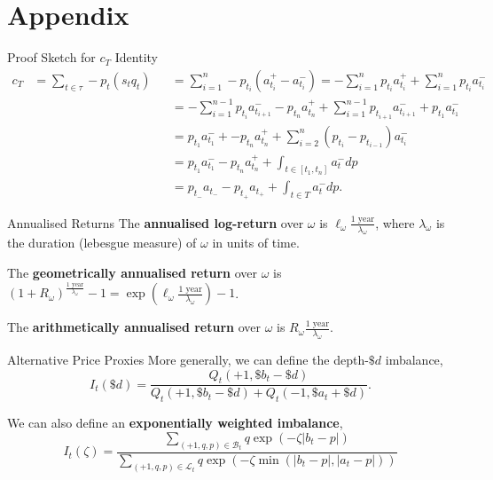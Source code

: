 \documentclass{beamer}
\begin{document}
\section{Appendix}
\begin{frame}{Proof Sketch for $c_T$ Identity}
	\begin{align*}
			c_{T}	&= \sum_{t\in\tau} - p_t (s_t q_t)	&&= \sum_{i=1}^n - p_{t_i} (a_{t_i}^+-a_{t_i}^-) = - \sum_{i=1}^n p_{t_i} a_{t_i}^+ + \sum_{i=1}^n p_{t_i} a_{t_i}^-
		\\		&					&&= - \sum_{i=1}^{n-1} p_{t_i} a_{t_{i+1}}^- - p_{t_n} a_{t_n}^+ + \sum_{i=1}^{n-1} p_{t_{i+1}} a_{t_{i+1}}^- + p_{t_1}a_{t_1}^-
		\\		&					&&= p_{t_1}a_{t_1}^- + - p_{t_n} a_{t_n}^+ + \sum_{i=2}^n (p_{t_i}-p_{t_{i-1}}) a_{t_i}^-
		\\		&					&&= p_{t_1}a_{t_1}^- - p_{t_n}a_{t_n}^+ + \int_{t\in[t_1,t_n]} a_t^- dp
		\\		&					&&= p_{t_-}a_{t_-} - p_{t_+}a_{t_+} + \int_{t\in T} a_t^- dp.
	\end{align*}
\end{frame}

\begin{frame}{Annualised Returns}
	The \textbf{annualised log-return} over $\omega$ is $\ell_\omega \frac{\textrm{1 year}}{\lambda_\omega}$, where $\lambda_\omega$ is the duration (lebesgue measure) of $\omega$ in units of time.%

	The \textbf{geometrically annualised return} over $\omega$ is $(1 + R_\omega)^\frac{\textrm{1 year}}{\lambda_\omega} - 1 = \exp\left(\ell_\omega \frac{\textrm{1 year}}{\lambda_\omega}\right) - 1$.

	The \textbf{arithmetically annualised return} over $\omega$ is $R_\omega \frac{\textrm{1 year}}{\lambda_\omega}$. %

\end{frame}

\begin{frame}{Alternative Price Proxies}
	More generally, we can define the depth-$\$d$ imbalance,
	$$I_t(\$d)=\frac{Q_t(+1,\$b_t-\$d)}{Q_t(+1,\$b_t-\$d)+Q_t(-1,\$a_t+\$d)}.$$%

	\pause

	We can also define an \textbf{exponentially weighted imbalance},
	$$I_t(\zeta) = \frac{\sum_{(+1,q,p)\in\mathcal{B}_t}q\exp(-\zeta\vert b_t-p\vert)}{\sum_{(+1,q,p)\in\mathcal{L}_t}q\exp(-\zeta\min(\vert b_t-p\vert,\vert a_t-p\vert))}$$%
\end{frame}
\end{document}

